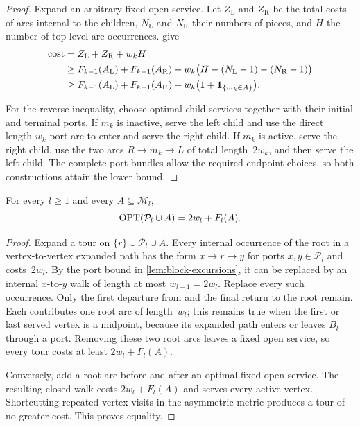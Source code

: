 \documentclass[12pt,a4paper,oneside]{report}
\begin{document}
\begin{proof}
Expand an arbitrary fixed open service.  Let $Z_{\mathrm L}$ and
$Z_{\mathrm R}$ be the total costs of arcs internal to the children,
$N_{\mathrm L}$ and $N_{\mathrm R}$ their numbers of pieces, and $H$ the
number of top-level arc occurrences.   give
\begin{align*}
    \operatorname{cost}
    &=Z_{\mathrm L}+Z_{\mathrm R}+w_kH\\
    &\ge F_{k-1}(A_{\mathrm L})+F_{k-1}(A_{\mathrm R})
       +w_k\bigl(H-(N_{\mathrm L}-1)-(N_{\mathrm R}-1)\bigr)\\
    &\ge F_{k-1}(A_{\mathrm L})+F_{k-1}(A_{\mathrm R})
       +w_k\bigl(1+\mathbf{1}_{\{m_k\in A\}}\bigr).
\end{align*}

For the reverse inequality, choose optimal child services together with their
initial and terminal ports.  If $m_k$ is inactive, serve the left child and
use the direct length-$w_k$ port arc to enter and serve the right child.  If
$m_k$ is active, serve the right child, use the two arcs
$R\to m_k\to L$ of total length~$2w_k$, and then serve the left child.  The
complete port bundles allow the required endpoint choices, so both
constructions attain the lower bound.
\end{proof}

\begin{lemma}\label{lem:recursive-root-normalization}
For every $l\ge1$ and every $A\subseteq\mathcal M_l$,
\begin{equation}\label{eq:recursive-root-normalization}
    \operatorname{OPT}(\mathcal P_l\cup A)=2w_l+F_l(A).
\end{equation}
\end{lemma}

\begin{proof}
Expand a tour on $\{r\}\cup\mathcal P_l\cup A$.  Every internal occurrence of
the root in a vertex-to-vertex expanded path has the form
$x\to r\to y$ for ports $x,y\in\mathcal P_l$ and costs~$2w_l$.  By the port
bound in \cref{lem:block-excursions}, it can be replaced by an internal
$x$-to-$y$ walk of length at most $w_{l+1}=2w_l$.  Replace every such
occurrence.  Only the first departure from and the final return to the root
remain.  Each contributes one root arc of length~$w_l$; this remains true
when the first or last served vertex is a midpoint, because its expanded path
enters or leaves $B_l$ through a port.  Removing these two root arcs leaves a
fixed open service, so every tour costs at least $2w_l+F_l(A)$.

Conversely, add a root arc before and after an optimal fixed open service.
The resulting closed walk costs $2w_l+F_l(A)$ and serves every active vertex.
Shortcutting repeated vertex visits in the asymmetric metric produces a tour of
no greater cost.  This proves equality.
\end{proof}
\end{document}
